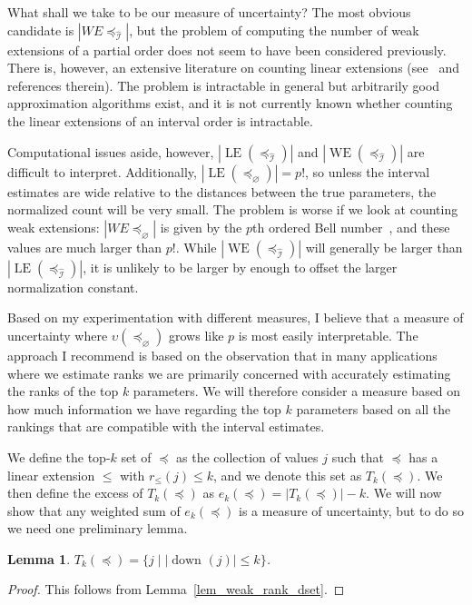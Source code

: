 \documentclass[12pt]{article}
\newcommand{\dset}[2][]{\operatorname{down}_{#1}(#2)}
\newcommand{\eord}{{\preceq_{\varnothing}}}
\newcommand{\iord}{{\preceq_{\hat{\mathcal{I}}}}}
\newcommand{\LE}[1]{\operatorname{LE}(#1)}
\newcommand{\WE}[1]{\operatorname{WE}(#1)}
\numberwithin{theorem}{section}
\newtheorem{lemma}[theorem]{Lemma}
\begin{document}
What shall we take to be our measure of uncertainty?  The most obvious candidate is $|WE{\iord}|$, but the problem of computing the number of weak extensions of a partial order does not seem to have been considered previously.  There is, however, an extensive literature on counting linear extensions (see~\cite{talvitie2018scalableScheme} and references therein).  The problem is intractable in general but arbitrarily good approximation algorithms exist, and it is not currently known whether counting the linear extensions of an interval order is intractable.

Computational issues aside, however, $|\LE{\iord}|$ and $|\WE{\iord}|$ are difficult to interpret.  Additionally, $|\LE{\eord}| = p!$, so unless the interval estimates are wide relative to the distances between the true parameters, the normalized count will be very small.  The problem is worse if we look at counting weak extensions: $|WE{\eord}|$ is given by the $p$th ordered Bell number~, and these values are much larger than $p!$.  While $|\WE{\iord}|$ will generally be larger than $|\LE{\iord}|$, it is unlikely to be larger by enough to offset the larger normalization constant.

Based on my experimentation with different measures, I believe that a measure of uncertainty where $\upsilon(\eord)$ grows like $p$ is most easily interpretable.  The approach I recommend is based on the observation that in many applications where we estimate ranks we are primarily concerned with accurately estimating the ranks of the top $k$ parameters.  We will therefore consider a measure based on how much information we have regarding the top $k$ parameters based on all the rankings that are compatible with the interval estimates.

We define the top-$k$ set of $\preceq$ as the collection of values $j$ such that $\preceq$ has a linear extension $\leqslant$ with $r_\leqslant(j) \leq k$, and we denote this set as $T_k(\preceq)$.  We then define the excess of $T_k(\preceq)$ as $e_k(\preceq) = |T_k(\preceq)| - k$.  We will now show that any weighted sum of $e_k(\preceq)$ is a measure of uncertainty, but to do so we need one preliminary lemma.

\begin{lemma}
\label{lem_top_set_alt}
$T_k(\preceq) = \{j \mid |\dset{j}| \leq k\}$.
\end{lemma}
\begin{proof}
This follows from Lemma~\ref{lem_weak_rank_dset}.
\end{proof}
\end{document}
